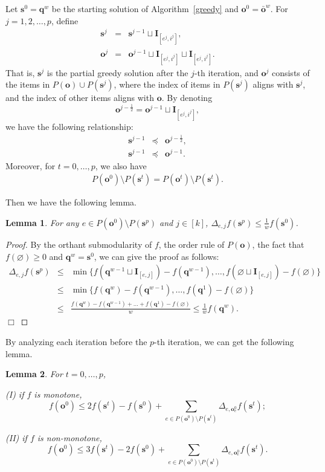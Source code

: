 \documentclass[preprint,12pt]{elsarticle}
\newtheorem{lemma}{Lemma}
\def\bea{\begin{eqnarray}}
\def\eea{\end{eqnarray}}
\def\nn{\nonumber}
\def\endzm{\hfill $\Box$ \bigskip}
\def\bo{\boldsymbol{o}}
\def\bs{\boldsymbol{s}}
\def\bq{\boldsymbol{q}}
\def\bI{\boldsymbol{I}}
\begin{document}
Let $\bs^0=\bq^w$ be the starting solution of Algorithm~\ref{greedy} and $\bo^0=\bar{\bo}^w$. For $j=1,2,\ldots,p$, define
\bea
\bs^j&=&\bs^{j-1}\sqcup \bI_{[e^j, i^j]}, \nn\\
\bo^j&=& \bo^{j-1}\sqcup \bI_{[e^j, i^j]} \sqcup \bI_{[e^j, i^j]}. \nn
\eea
That is, $\bs^j$ is the partial greedy solution after the $j$-th iteration, and $\bo^j$ consists of the items in $P(\bo)\cup P(\bs^j)$, where the index of items in $P(\bs^j)$ aligns with $\bs^j$, and the index of other items aligns with $\bo$. By denoting
\[\bo^{j-\frac{1}{2}}=\bo^{j-1}\sqcup \bI_{[e^j, i^j]},
\]we have the following relationship:%
\bea
\bs^{j-1}&\preceq&\bo^{j-\frac{1}{2}},\label{patial1}\\
\bs^{j-1}&\preceq&\bo^{j-1}\label{patial2}.
\eea
Moreover, for $t=0, \dots, p$, we also have
\bea\label{(supp-t)}
P(\bo^0)\setminus P(\bs^t) = P(\bo^t) \setminus P(\bs^t ).
\eea

Then we have the following lemma.
\begin{lemma}\label{lem123}
For any $e\in P(\bo^0)\setminus P(\bs^{p})$ and $j\in [k]$, $\Delta_{e,j}f(\bs^{p})\le\frac{1}{w}f(\bs^0)$.
\end{lemma}
\begin{proof}
By the orthant submodularity of $f$, the order rule of $P(\bo)$, the fact that $f(\varnothing)\geq 0$ and $\bq^w=\bs^0$, we can give the proof as follows:
\bea
\Delta_{e, j}f(\bs^{p})
&\le& \min\{f( \bq^{w-1} \sqcup \bI_{[e,j]})-f( \bq^{w-1} ), \dots, f(\varnothing\sqcup\bI_{[e,j]})-f(\varnothing) \} \nn\\
&\leq& \min\{f( \bq^w )-f( \bq^{w-1} ), \dots, f(\bq^1)-f(\varnothing) \} \nn\\
&\leq& \frac{f( \bq^w )-f( \bq^{w-1} )+ \dots +f(\bq^1)-f(\varnothing)}{w} \leq \frac{1}{w} f(\bq^w).\nn
\eea
\endzm
\end{proof}


By analyzing each iteration before the $p$-th iteration, we can get the following lemma.

\begin{lemma}\label{lem1}
For $t=0, \dots, p$,

{\rm (I)} if $f$ is monotone,
\[
f(\bo^0)\le 2f(\bs^t)-f(\bs^0)+\sum_{e\in P(\bo^0)\setminus P(\bs^t)}\Delta_{e, \bo^0_e}f(\bs^t);
\]

{\rm (II)} if $f$ is non-monotone,
\[
f(\bo^0)\le3f(\bs^t)-2f(\bs^0)+\sum_{e\in P(\bo^0)\setminus P(\bs^t)}\Delta_{e, \bo^0_e}f(\bs^t). \]
\end{lemma}
\end{document}
